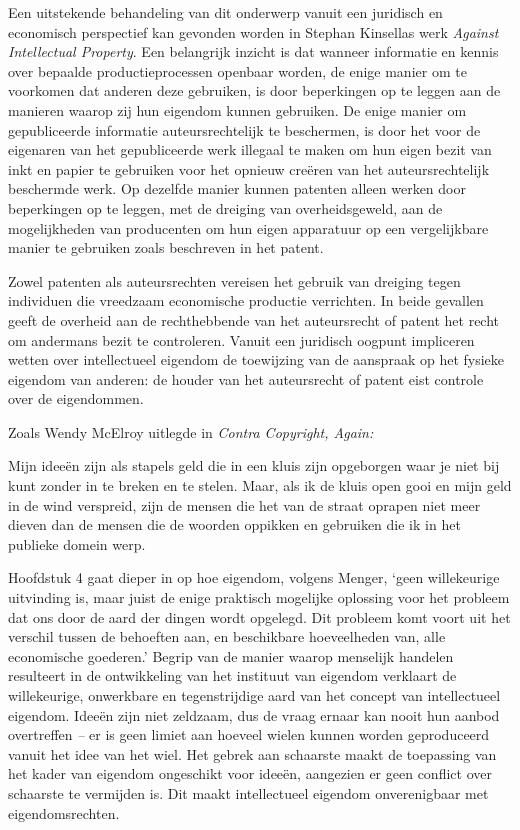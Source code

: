 Een uitstekende behandeling van dit onderwerp vanuit een juridisch en economisch perspectief kan gevonden worden in Stephan Kinsella\textquotesingle s werk \emph{Against Intellectual Property}. \autocite{85} Een belangrijk inzicht is dat wanneer informatie en kennis over bepaalde productieprocessen openbaar worden, de enige manier om te voorkomen dat anderen deze gebruiken, is door beperkingen op te leggen aan de manieren waarop zij hun eigendom kunnen gebruiken. De enige manier om gepubliceerde informatie auteursrechtelijk te beschermen, is door het voor de eigenaren van het gepubliceerde werk illegaal te maken om hun eigen bezit van inkt en papier te gebruiken voor het opnieuw creëren van het auteursrechtelijk beschermde werk. Op dezelfde manier kunnen patenten alleen werken door beperkingen op te leggen, met de dreiging van overheidsgeweld, aan de mogelijkheden van producenten om hun eigen apparatuur op een vergelijkbare manier te gebruiken zoals beschreven in het patent.

Zowel patenten als auteursrechten vereisen het gebruik van dreiging tegen individuen die vreedzaam economische productie verrichten. In beide gevallen geeft de overheid aan de rechthebbende van het auteursrecht of patent het recht om andermans bezit te controleren. Vanuit een juridisch oogpunt impliceren wetten over intellectueel eigendom de toewijzing van de aanspraak op het fysieke eigendom van anderen: de houder van het auteursrecht of patent eist controle over de eigendommen.

Zoals Wendy McElroy uitlegde in \emph{Contra Copyright, Again:}

\begin{blockquotebox}
    Mijn ideeën zijn als stapels geld die in een kluis zijn opgeborgen waar je niet bij kunt zonder in te breken en te stelen. Maar, als ik de kluis open gooi en mijn geld in de wind verspreid, zijn de mensen die het van de straat oprapen niet meer dieven dan de mensen die de woorden oppikken en gebruiken die ik in het publieke domein werp.\footnotemark
\end{blockquotebox}

Hoofdstuk 4 gaat dieper in op hoe eigendom, volgens Menger, `geen willekeurige uitvinding is, maar juist de enige praktisch mogelijke oplossing voor het probleem dat ons door de aard der dingen wordt opgelegd. Dit probleem komt voort uit het verschil tussen de behoeften aan, en beschikbare hoeveelheden van, alle economische goederen.' \autocite{87} Begrip van de manier waarop menselijk handelen resulteert in de ontwikkeling van het instituut van eigendom verklaart de willekeurige, onwerkbare en tegenstrijdige aard van het concept van intellectueel eigendom. Ideeën zijn niet zeldzaam, dus de vraag ernaar kan nooit hun aanbod overtreffen \emph{--} er is geen limiet aan hoeveel wielen kunnen worden geproduceerd vanuit het idee van het wiel. Het gebrek aan schaarste maakt de toepassing van het kader van eigendom ongeschikt voor ideeën, aangezien er geen conflict over schaarste te vermijden is. Dit maakt intellectueel eigendom onverenigbaar met eigendomsrechten.

